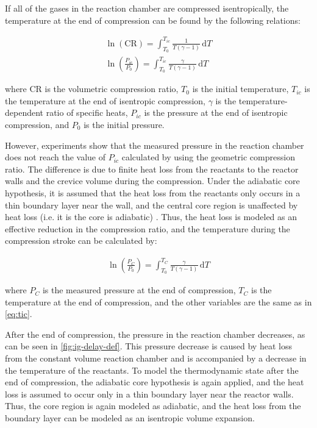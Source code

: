\documentclass[12pt, letterpaper]{article}
\begin{document}
If all of the gases in the reaction chamber are compressed isentropically,
the temperature at the end of compression can be found by the
following relations:

\begin{subequations}
\label{eq:tic}
\begin{align}
\ln\left(\text{CR}\right) = \int_{T_0}^{T_{ic}} \! \frac{1}{T\left(\gamma-1\right)} \, \mathrm{d} T \\
\ln\left(\frac{P_{ic}}{P_0}\right) = \int_{T_0}^{T_{ic}} \! \frac{\gamma}{T\left(\gamma-1\right)} \, \mathrm{d} T
\end{align}
\end{subequations}

\noindent
where CR is the volumetric compression ratio, $T_0$ is the initial temperature,
$T_{ic}$ is the temperature at the end of isentropic compression, $\gamma$ is the
temperature-dependent ratio of specific heats, $P_{ic}$ is the pressure at the
end of isentropic compression, and $P_0$ is the initial pressure.

However, experiments show that the measured pressure in the reaction chamber
does not reach the value of $P_{ic}$ calculated by using the geometric
compression ratio. The difference is due to finite heat loss from the
reactants to the reactor walls and the crevice volume during the
compression. Under the adiabatic core hypothesis, it is assumed that
the heat loss from the reactants only occurs in a thin boundary layer
near the wall, and the central core region is unaffected by heat loss
(i.e. it is the core is adiabatic) \cite{Desgroux1995}. Thus, the heat
loss is modeled as an effective reduction in the compression ratio, and
the temperature during the compression stroke can be calculated by:

\begin{align}
\ln\left(\frac{P_{C}}{P_0}\right) = \int_{T_0}^{T_{C}} \! \frac{\gamma}{T\left(\gamma-1\right)} \, \mathrm{d} T
\label{eq:tc}
\end{align}

\noindent
where $P_C$ is the measured pressure at the end of compression, $T_C$
is the temperature at the end of compression, and the other variables
are the same as in \autoref{eq:tic}.

After the end of compression, the pressure in the reaction chamber
decreases, as can be seen in \autoref{fig:ig-delay-def}. This pressure
decrease is caused by heat loss from the constant volume reaction
chamber and is accompanied by a decrease in the temperature of the
reactants. To model the thermodynamic state after the end of compression,
the adiabatic core hypothesis is again applied, and the heat loss is
assumed to occur only in a thin boundary layer near the reactor walls.
Thus, the core region is again modeled as adiabatic, and the heat loss
from the boundary layer can be modeled as an isentropic volume
expansion.
\end{document}
